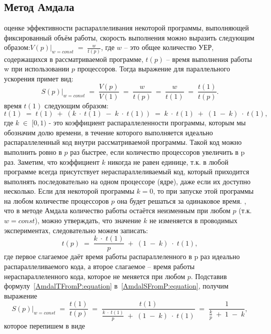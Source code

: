 { %
	\subsection{Метод Амдала}
	 оценке эффективности распараллеливания некоторой программы, выполняющей фиксированный объём работы, скорость выполнения можно выразить следующим образом:$\left.V(p)\right|_{w=const}\;=\;\frac w{t(p)}$, где $w$ – это общее количество УЕР, содержащихся в рассматриваемой программе, $t(p)$ – время выполнения работы w при использовании $p$ процессоров. Тогда выражение для параллельного ускорения примет вид:
	\begin{equation}
		\label{AmdalSFromP:equation}
		\left.S(p)\right|_{w=const}\;=\;\frac{V(p)}{V(1)}\;=\;\frac w{t(p)}\;=\;\frac w{t(1)}\;=\;\frac{t(1)}{t(p)}.
	\end{equation}
	 время $t(1)$ следующим образом:
	\begin{equation}
		t(1)\;=\;t(1)\;+\;(k\;\cdot\;t(1)\;-\;k\;\cdot\;t(1))\;=\;k\;\cdot\;t(1)\;+\;(1\;-\;k)\;\cdot\;t(1),
	\end{equation}
	где $k\;\in\;\lbrack0,1)$ - это коэффициент распараллеленности программы, которым мы обозначим долю времени, в течение которого выполняется идеально распараллеленный код внутри рассматриваемой программы. Такой код можно выполнить ровно в $p$ раз быстрее, если количество процессоров увеличить в p раз. Заметим, что коэффициент $k$ никогда не равен единице, т.к. в любой программе всегда присутствует нераспараллеливаемый код, который приходится выполнять последовательно на одном процессоре (ядре), даже если их доступно несколько. Если для некоторой программы $k=0$, то при запуске этой программы на любом количестве процессоров $p$ она будет решаться за одинаковое время.
	, что в методе Амдала количество работы остаётся неизменным при любом $p$ (т.к. $w=const$), можно утверждать, что значение $k$ не изменяется в проводимых экспериментах, следовательно можем записать:
	\begin{equation}
		\label{AmdalTFromP:equation}
		t(p)\;=\;\frac{k\;\cdot\;t(1)}p\;+\;(1\;-\;k)\;\cdot\;t(1),
	\end{equation}
	где первое слагаемое даёт время работы распараллеленного в p раз идеально распараллеливаемого кода, а второе слагаемое – время работы нераспараллеленного кода, которое не меняется при любом $p$. Подставив формулу~\eqref{AmdalTFromP:equation} в~\eqref{AmdalSFromP:equation}, получим выражение $$\left.S(p)\right|_{w=const}\;=\;\frac{t(1)}{t(p)}\;=\;\frac{t(1)}{{\displaystyle\frac{k\;\cdot\;t(1)}p}\;+\;(1\;-\;k)\;\cdot\;t(1)}\;=\;\frac1{{\displaystyle\frac kp}\;+\;1\;-\;k},$$ которое перепишем в виде
}
